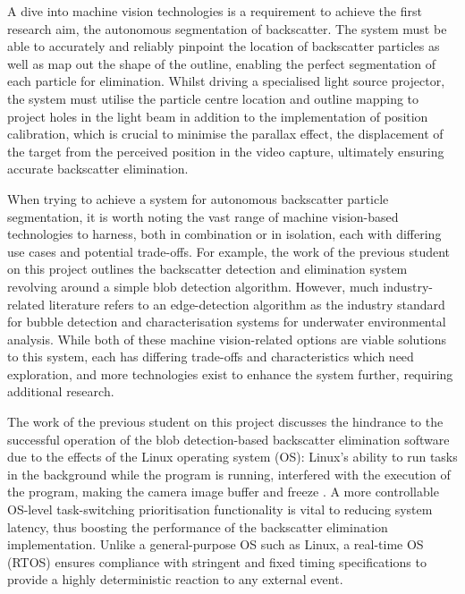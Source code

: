 A dive into machine vision technologies is a requirement to achieve the first research aim, the autonomous segmentation of backscatter. The system must be able to accurately and reliably pinpoint the location of backscatter particles as well as map out the shape of the outline, enabling the perfect segmentation of each particle for elimination. Whilst driving a specialised light source projector, the system must utilise the particle centre location and outline mapping to project holes in the light beam in addition to the implementation of position calibration, which is crucial to minimise the parallax effect, the displacement of the target from the perceived position in the video capture, ultimately ensuring accurate backscatter elimination.

When trying to achieve a system for autonomous backscatter particle segmentation, it is worth noting the vast range of machine vision-based technologies to harness, both in combination or in isolation, each with differing use cases and potential trade-offs. For example, the work of the previous student on this project \cite{katieshepherdMachineVisionBased2023} outlines the backscatter detection and elimination system revolving around a simple blob detection algorithm. However, much industry-related literature refers to an edge-detection algorithm as the industry standard for bubble detection and characterisation systems for underwater environmental analysis. While both of these machine vision-related options are viable solutions to this system, each has differing trade-offs and characteristics which need exploration, and more technologies exist to enhance the system further, requiring additional research.

The work of the previous student on this project discusses the hindrance to the successful operation of the blob detection-based backscatter elimination software due to the effects of the Linux operating system (OS): Linux's ability to run tasks in the background while the program is running, interfered with the execution of the program, making the camera image buffer and freeze \cite{katieshepherdMachineVisionBased2023}. A more controllable OS-level task-switching prioritisation functionality is vital to reducing system latency, thus boosting the performance of the backscatter elimination implementation. Unlike a general-purpose OS such as Linux, a real-time OS (RTOS) ensures compliance with stringent and fixed timing specifications to provide a highly deterministic reaction to any external event.

